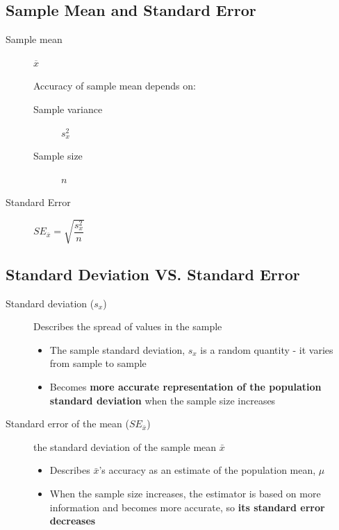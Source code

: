 \documentclass[10pt,article]{article}
\begin{document}
\subsection{Sample Mean and Standard Error}
\label{sec:orgb846a29}
\begin{multicols}{2}
\begin{description}
\item[{Sample mean}] \(\overline{x}\)

Accuracy of sample mean depends on:
\begin{description}
\item[{Sample variance}] \(s_x^2\)
\item[{Sample size}] \(n\)
\end{description}
\end{description}

\begin{description}
\item[{Standard Error}] \(SE_{\overline{x}} = \sqrt{\dfrac{s^2_x}{n}}\)
\end{description}

\end{multicols}

\subsection{Standard Deviation VS. Standard Error}
\label{sec:orgfef575e}
\begin{description}
\item[{Standard deviation (\(s_{x}\))}] Describes the spread of values in the sample 

\begin{itemize}
\item The sample standard deviation, \(s_x\) is a random quantity - it varies from
sample to sample
\item Becomes \textbf{more accurate representation of the population standard
deviation} when the sample size increases
\end{itemize}
\end{description}

\begin{description}
\item[{Standard error of the mean (\(SE_{\bar{x}}\))}] the standard deviation of
the sample mean \(\bar{x}\)

\begin{itemize}
\item Describes \(\bar{x}\)'s accuracy as an estimate of the population mean,
\(\mu\)
\item When the sample size increases, the estimator is based on more information
and becomes more accurate, so \textbf{its standard error decreases}
\end{itemize}
\end{description}
\end{document}
